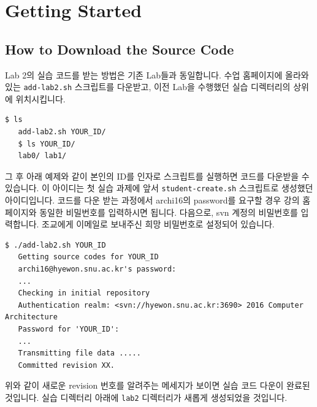 \documentclass{article}
\begin{document}
\section{Getting Started}
\subsection{How to Download the Source Code}
Lab 2의 실습 코드를 받는 방법은 기존 Lab들과 동일합니다.
수업 홈페이지에 올라와 있는 \texttt{add-lab2.sh} 스크립트를 다운받고,
이전 Lab을 수행했던 실습 디렉터리의 상위에 위치시킵니다.

\begin{Verbatim}[frame=single]
   $ ls
   add-lab2.sh YOUR_ID/
   $ ls YOUR_ID/
   lab0/ lab1/
\end{Verbatim}

그 후 아래 예제와 같이 본인의 ID를 인자로 스크립트를 실행하면 코드를 다운받을 수 있습니다.
이 아이디는 첫 실습 과제에 앞서 \texttt{student-create.sh} 스크립트로 생성했던 아이디입니다.
코드를 다운 받는 과정에서 archi16의 password를 요구할 경우
강의 홈페이지와 동일한 비밀번호를 입력하시면 됩니다.
다음으로, svn 계정의 비밀번호를 입력합니다.
조교에게 이메일로 보내주신 희망 비밀번호로 설정되어 있습니다.

\begin{Verbatim}[frame=single]
   $ ./add-lab2.sh YOUR_ID
   Getting source codes for YOUR_ID
   archi16@hyewon.snu.ac.kr's password: 
   ...
   Checking in initial repository
   Authentication realm: <svn://hyewon.snu.ac.kr:3690> 2016 Computer Architecture
   Password for 'YOUR_ID': 
   ...
   Transmitting file data .....
   Committed revision XX.
\end{Verbatim}
위와 같이 새로운 revision 번호를 알려주는 메세지가 보이면 실습 코드 다운이 완료된 것입니다. 
실습 디렉터리 아래에 \texttt{lab2} 디렉터리가 새롭게 생성되었을 것입니다.
\end{document}
